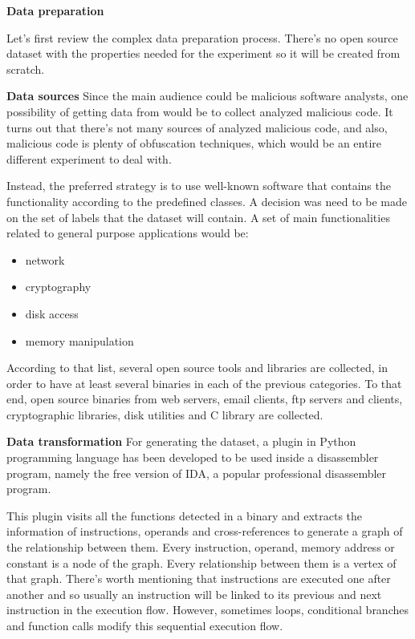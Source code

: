\textbf{Data preparation}

Let's first review the complex data preparation process. There's no open source dataset with the properties needed for the experiment so it will be created from scratch.



\textbf{Data sources}
Since the main audience could be malicious software analysts, one possibility of getting data from would be to collect analyzed malicious code. It turns out that there's not many sources of analyzed malicious code, and also, malicious code is plenty of obfuscation techniques, which would be an entire different experiment to deal with. 

Instead, the preferred strategy is to use well-known software that contains the functionality according to the predefined classes. A decision was need to be made on the set of labels that the dataset will contain. A set of main functionalities related to general purpose applications would be:
\begin{itemize}
	\item network
	\item cryptography
	\item disk access
	\item memory manipulation
\end{itemize}
According to that list, several open source tools and libraries are collected, in order to have at least several binaries in each of the previous categories. To that end, open source binaries from web servers, email clients, ftp servers and clients, cryptographic libraries, disk utilities and C library are collected.





\textbf{Data transformation}
For generating the dataset, a plugin in Python programming language has been developed to be used inside a disassembler program, namely the free version of IDA, a popular professional disassembler program.


This plugin visits all the functions detected in a binary and extracts the information of instructions, operands and cross-references to generate a graph of the relationship between them. Every instruction, operand, memory address or constant is a node of the graph. Every relationship between them is a vertex of that graph. There's worth mentioning that instructions are executed one after another and so usually an instruction will be linked to its previous and next instruction in the execution flow. However, sometimes loops, conditional branches and function calls modify this sequential execution flow.

